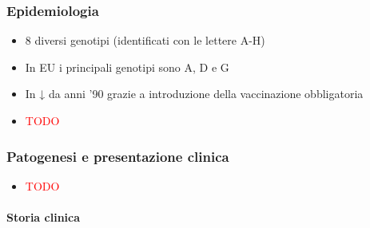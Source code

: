 \documentclass[italian,]{article}
\newcommand{\TODO}[1]{\textcolor{red}{\textsf{\footnotesize{TODO #1}}}} %
\begin{document}
\hypertarget{epidemiologia-7}{%
\subsubsection{Epidemiologia}\label{epidemiologia-7}}

\begin{itemize}
\item
  8 diversi genotipi (identificati con le lettere A-H)
\item
  In EU i principali genotipi sono A, D e G
\item
  In ↓ da anni '90 grazie a introduzione della vaccinazione obbligatoria
\item
  \TODO{}
\end{itemize}

\hypertarget{patogenesi-e-presentazione-clinica}{%
\subsubsection{Patogenesi e presentazione
clinica}\label{patogenesi-e-presentazione-clinica}}

\begin{itemize}
\item
  \TODO{}
\end{itemize}

\hypertarget{storia-clinica}{%
\paragraph{Storia clinica}\label{storia-clinica}}
\end{document}

